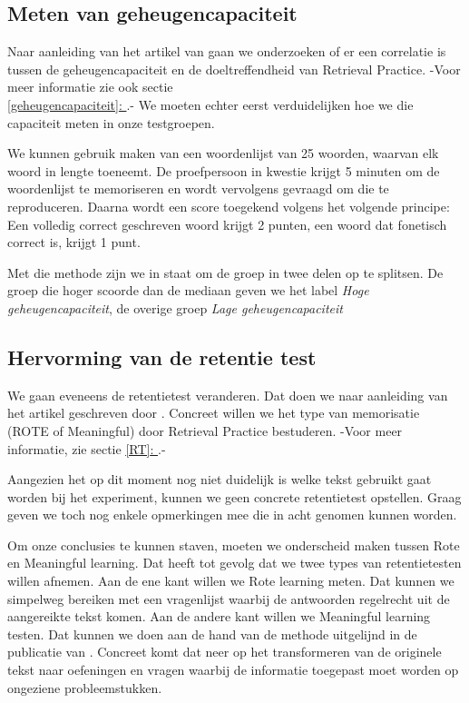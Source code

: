 \documentclass{hogent-article}
\newcommand{\customref}[1]{\underline{\ref{#1}: \nameref{#1}}}
\begin{document}
\subsection{Meten van geheugencapaciteit}
\label{methodology-gc}
Naar aanleiding van het artikel van \textcite{Agarwal_2016} gaan we onderzoeken of er een correlatie is tussen de geheugencapaciteit en de doeltreffendheid van Retrieval Practice. -Voor meer informatie zie ook sectie \\\customref{geheugencapaciteit}.- We moeten echter eerst verduidelijken hoe we die capaciteit meten in onze testgroepen.\\
\par
\noindent
We kunnen gebruik maken van een woordenlijst van 25 woorden, waarvan elk woord in lengte toeneemt. De proefpersoon in kwestie krijgt 5 minuten om de woordenlijst te memoriseren en wordt vervolgens gevraagd om die te reproduceren. Daarna wordt een score toegekend volgens het volgende principe: Een volledig correct geschreven woord krijgt 2 punten, een woord dat fonetisch correct is, krijgt 1 punt.\\
\par
\noindent
Met die methode zijn we in staat om de groep in twee delen op te splitsen. De groep die hoger scoorde dan de mediaan geven we het label \textit{Hoge geheugencapaciteit}, de overige groep  \textit{Lage geheugencapaciteit}

\subsection{Hervorming van de retentie test}
We gaan eveneens de retentietest veranderen. Dat doen we naar aanleiding van het artikel geschreven door \textcite{van_Gog_2012}. Concreet willen we het type van memorisatie (ROTE of Meaningful) door Retrieval Practice  bestuderen. -Voor meer informatie, zie sectie \customref{RT}.-\\
\par
\noindent
Aangezien het op dit moment nog niet duidelijk is welke tekst gebruikt gaat worden bij het experiment, kunnen we geen concrete retentietest opstellen. Graag geven we toch nog enkele opmerkingen mee die in acht genomen kunnen worden.\\
\par
\noindent
Om onze conclusies te kunnen staven, moeten we onderscheid maken tussen Rote en Meaningful learning. Dat heeft tot gevolg dat we twee types van retentietesten willen afnemen. Aan de ene kant willen we Rote learning meten. Dat kunnen we simpelweg bereiken met een vragenlijst waarbij de antwoorden regelrecht uit de aangereikte tekst komen. Aan de andere kant willen we Meaningful learning testen. Dat kunnen we doen aan de hand van de methode uitgelijnd in de publicatie van \textcite{Mayer_2002}. Concreet komt dat neer op het transformeren van de originele tekst naar oefeningen en vragen waarbij de informatie toegepast moet worden op ongeziene probleemstukken.
\end{document}
